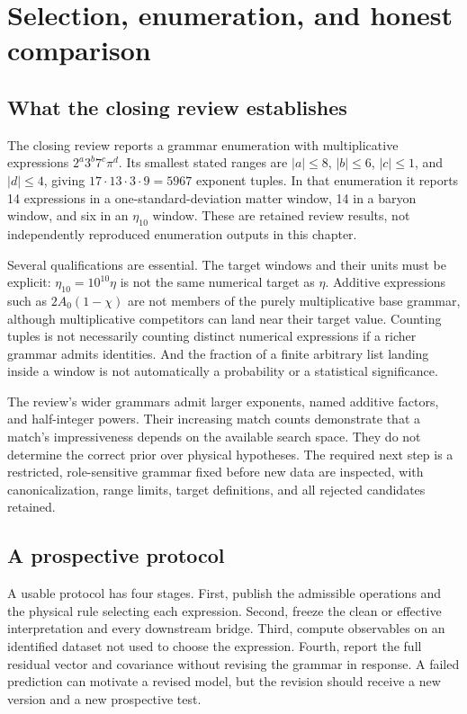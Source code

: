 \section{Selection, enumeration, and honest comparison}
\subsection{What the closing review establishes}
The closing review reports a grammar enumeration with multiplicative expressions $2^a3^b7^c\pi^d$. Its smallest stated ranges are $|a|\le8$, $|b|\le6$, $|c|\le1$, and $|d|\le4$, giving $17\cdot13\cdot3\cdot9=5967$ exponent tuples. In that enumeration it reports 14 expressions in a one-standard-deviation matter window, 14 in a baryon window, and six in an $\eta_{10}$ window. These are retained review results, not independently reproduced enumeration outputs in this chapter.

Several qualifications are essential. The target windows and their units must be explicit: $\eta_{10}=10^{10}\eta$ is not the same numerical target as $\eta$. Additive expressions such as $2A_0(1-\chi)$ are not members of the purely multiplicative base grammar, although multiplicative competitors can land near their target value. Counting tuples is not necessarily counting distinct numerical expressions if a richer grammar admits identities. And the fraction of a finite arbitrary list landing inside a window is not automatically a probability or a statistical significance.

The review's wider grammars admit larger exponents, named additive factors, and half-integer powers. Their increasing match counts demonstrate that a match's impressiveness depends on the available search space. They do not determine the correct prior over physical hypotheses. The required next step is a restricted, role-sensitive grammar fixed before new data are inspected, with canonicalization, range limits, target definitions, and all rejected candidates retained.

\subsection{A prospective protocol}
A usable protocol has four stages. First, publish the admissible operations and the physical rule selecting each expression. Second, freeze the clean or effective interpretation and every downstream bridge. Third, compute observables on an identified dataset not used to choose the expression. Fourth, report the full residual vector and covariance without revising the grammar in response. A failed prediction can motivate a revised model, but the revision should receive a new version and a new prospective test.

